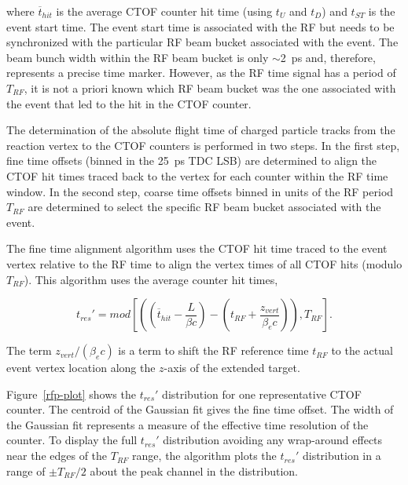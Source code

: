 \documentclass{elsart}
\begin{document}
\noindent
where $\overline{t}_{hit}$ is the average CTOF counter hit time (using $t_U$ and $t_D$) and $t_{ST}$
is the event start time. The event start time is associated with the RF but needs to be synchronized
with the particular RF beam bucket associated with the event. The beam bunch width within the RF beam
bucket is only $\sim$2~ps and, therefore, represents a precise time marker. However, as the RF time
signal has a period of $T_{RF}$, it is not a priori known which RF beam bucket was the one associated with
the event that led to the hit in the CTOF counter.

The determination of the absolute flight time of charged particle tracks from the reaction vertex
to the CTOF counters is performed in two steps. In the first step, fine time offsets (binned in the
25~ps TDC LSB) are determined to align the CTOF hit times traced back to the vertex for
each counter within the RF time window. In the second step, coarse time offsets binned in units of the
RF period $T_{RF}$ are determined to select the specific RF beam bucket associated with the event.

The fine time alignment algorithm uses the CTOF hit time traced to the event vertex relative to the
RF time to align the vertex times of all CTOF hits (modulo $T_{RF}$). This algorithm uses the average
counter hit times, 

\begin{equation}
t_{res}' = mod \left[ \left( \left(\overline{t}_{hit} - \frac{L}{\beta c} \right) -
\left(t_{RF} + \frac{z_{vert}}{\beta_e c} \right) \right), T_{RF} \right].
\end{equation}

\noindent
The term $z_{vert}/(\beta_e c)$ is a term to shift the RF reference time $t_{RF}$ to the actual event
vertex location along the $z$-axis of the extended target.

Figure~\ref{rfp-plot} shows the $t_{res}'$ distribution for one representative CTOF counter. The
centroid of the Gaussian fit gives the fine time offset. The width of the Gaussian fit represents
a measure of the effective time resolution of the counter. To display the full $t_{res}'$ distribution
avoiding any wrap-around effects near the edges of the $T_{RF}$ range, the algorithm plots the
$t_{res}'$ distribution in a range of $\pm T_{RF}/2$ about the peak channel in the distribution.
\end{document}
